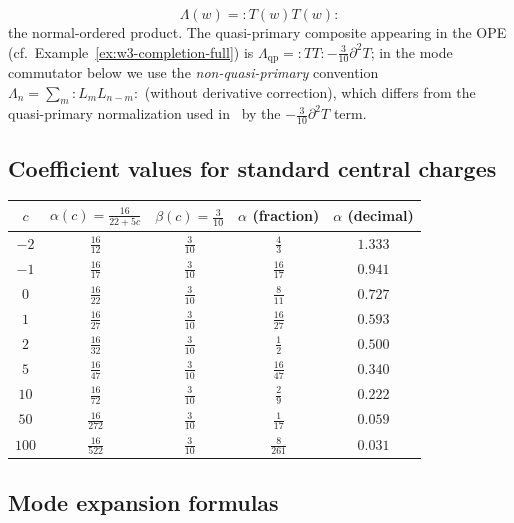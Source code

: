 \begin{equation}
\Lambda(w) = {:}T(w)T(w){:}
\end{equation}
the normal-ordered product. The quasi-primary composite appearing in the OPE (cf.\ Example~\ref{ex:w3-completion-full}) is $\Lambda_{\mathrm{qp}} = {:}TT{:} - \tfrac{3}{10}\partial^2 T$; in the mode commutator below we use the \emph{non-quasi-primary} convention $\Lambda_n = \sum_m {:}L_m L_{n-m}{:}$ (without derivative correction), which differs from the quasi-primary normalization used in~\cite{Bouwknegt-Schoutens} by the $-\tfrac{3}{10}\partial^2 T$ term.

\subsection{Coefficient values for standard central charges}

\begin{center}
\begin{tabular}{|c|c|c|c|c|}
\hline
$c$ & $\alpha(c) = \frac{16}{22+5c}$ & $\beta(c) = \frac{3}{10}$ &
$\alpha$ (fraction) & $\alpha$ (decimal) \\
\hline
$-2$ & $\frac{16}{12}$ & $\frac{3}{10}$ & $\frac{4}{3}$ & $1.333$ \\
\hline
$-1$ & $\frac{16}{17}$ & $\frac{3}{10}$ & $\frac{16}{17}$ & $0.941$ \\
\hline
$0$ & $\frac{16}{22}$ & $\frac{3}{10}$ & $\frac{8}{11}$ & $0.727$ \\
\hline
$1$ & $\frac{16}{27}$ & $\frac{3}{10}$ & $\frac{16}{27}$ & $0.593$ \\
\hline
$2$ & $\frac{16}{32}$ & $\frac{3}{10}$ & $\frac{1}{2}$ & $0.500$ \\
\hline
$5$ & $\frac{16}{47}$ & $\frac{3}{10}$ & $\frac{16}{47}$ & $0.340$ \\
\hline
$10$ & $\frac{16}{72}$ & $\frac{3}{10}$ & $\frac{2}{9}$ & $0.222$ \\
\hline
$50$ & $\frac{16}{272}$ & $\frac{3}{10}$ & $\frac{1}{17}$ & $0.059$ \\
\hline
$100$ & $\frac{16}{522}$ & $\frac{3}{10}$ & $\frac{8}{261}$ & $0.031$ \\
\hline
\end{tabular}
\end{center}

\subsection{Mode expansion formulas}

